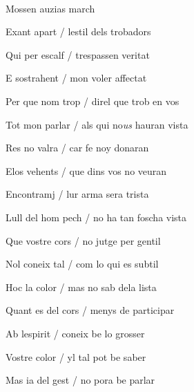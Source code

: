 \documentclass[12pt]{article}
\renewcommand{\espaiAbansEtiquetaPoema}{\vspace{0ex}}
\begin{document}
\begin{estrofa}

\espaiAbansEtiquetaPoema

\\

\begin{rubrica}

Mossen auzias march \clauTancada

\end{rubrica}

\end{estrofa}


\begin{estrofa}

 Exant apart / lestil dels trobadors

 Qui per escalf / trespassen veritat

 E sostrahent / mon voler affectat

 Per que nom trop / direl que trob en vos

 Tot mon parlar / als qui no\textit{us} hauran vista

 Res no valra / car fe noy donaran

 Elos vehents / que dins vos no veuran

 Encontramj / lur arma sera trista

\end{estrofa}



\begin{estrofa}

 Lull del hom pech / no ha tan foscha vista

 Que vostre cors / no jutge per gentil

 Nol coneix tal / com lo qui es subtil

 Hoc la color / mas no sab dela lista

 Quant es del cors / menys de participar

 Ab lespirit / coneix be lo grosser

 Vostre color / yl tal pot be saber

 Mas ia del gest / no pora be parlar

\end{estrofa}
\end{document}
